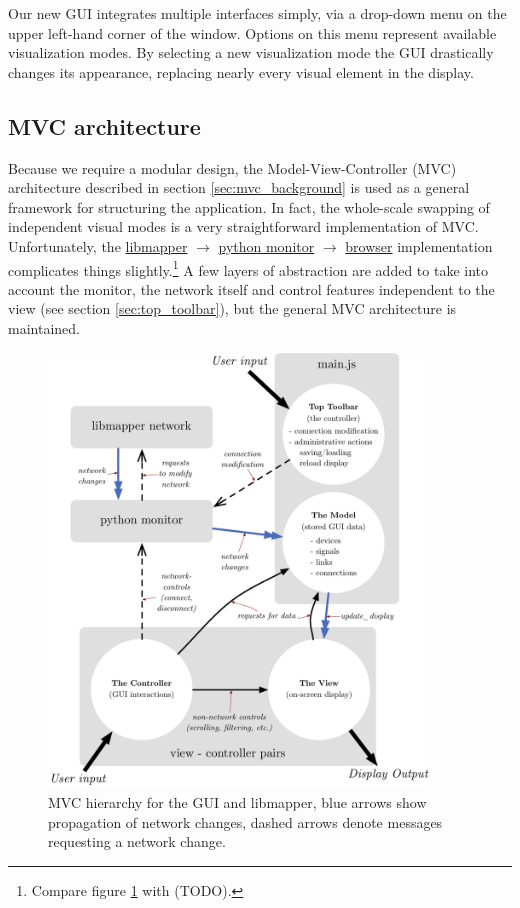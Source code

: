 Our new GUI integrates multiple interfaces simply, via a drop-down menu on the upper left-hand corner of the window. Options on this menu represent available visualization modes. By selecting a new visualization mode the GUI drastically changes its appearance, replacing nearly every visual element in the display.

	\subsection{MVC architecture} %
	\label{sec:mvc_architecture}

Because we require a modular design, the Model-View-Controller (MVC) architecture described in section \ref{sec:mvc_background} is used as a general framework for structuring the application. In fact, the whole-scale swapping of independent visual modes is a very straightforward implementation of MVC. Unfortunately, the \url{libmapper} $\rightarrow$ \url{python monitor} $\rightarrow$ \url{browser} implementation complicates things slightly.\footnote{Compare figure \ref{fig:mapper_network} with (TODO).} A few layers of abstraction are added to take into account the monitor, the network itself and control features independent to the view (see section \ref{sec:top_toolbar}), but the general MVC architecture is maintained.

\begin{figure}[!ht]
\centering
	\includegraphics[width=0.9\textwidth]{figures/mapper_network2}
\caption{MVC hierarchy for the GUI and libmapper, blue arrows show propagation of network changes, dashed arrows denote messages requesting a network change.}
\label{fig:mapper_network}
\end{figure}


